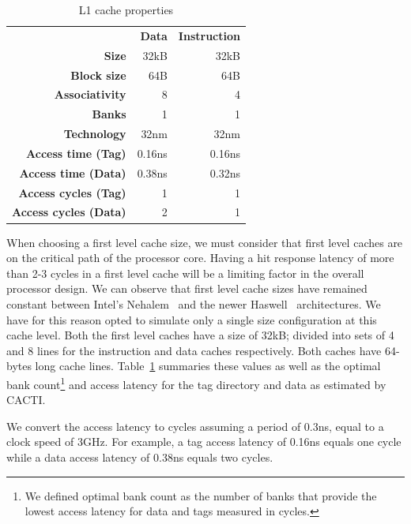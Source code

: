 \begin{table}[ht]
\centering
\begin{tabular}{rrr}
\toprule
                          & \bf{Data}     & \bf{Instruction} \\
\bf{Size}                 & 32kB          & 32kB      \\
\bf{Block size}           & 64B           & 64B       \\
\bf{Associativity}        & 8             & 4         \\
\bf{Banks}                & 1             & 1         \\
\bf{Technology}           & 32nm          & 32nm      \\
\bf{Access time (Tag)}    & 0.16ns        & 0.16ns    \\
\bf{Access time (Data)}   & 0.38ns        & 0.32ns    \\
\bf{Access cycles (Tag)}  & 1             & 1         \\
\bf{Access cycles (Data)} & 2             & 1         \\
\bottomrule
\end{tabular}
\caption{L1 cache properties}
\label{tbl:processor_model:l1}
\end{table}

When choosing a first level cache size, we must consider that first level caches are on the critical path of the processor core.
Having a hit response latency of more than 2-3 cycles in a first level cache will be a limiting factor in the overall processor design.
We can observe that first level cache sizes have remained constant between Intel's Nehalem~\cite{Thomadakis2011} and the newer Haswell~\cite{Jain2013} architectures.
We have for this reason opted to simulate only a single size configuration at this cache level.
Both the first level caches have a size of 32kB; divided into sets of 4 and 8 lines for the instruction and data caches respectively. 
Both caches have 64-bytes long cache lines.
Table~\ref{tbl:processor_model:l1} summaries these values as well as the optimal bank count\footnote{We defined optimal bank count as the number of banks that provide the lowest access latency for data and tags measured in cycles.} and access latency for the tag directory and data as estimated by CACTI. 

We convert the access latency to cycles assuming a period of 0.3ns, equal to a clock speed of 3GHz.
For example, a tag access latency of 0.16ns equals one cycle while a data access latency of 0.38ns equals two cycles.
